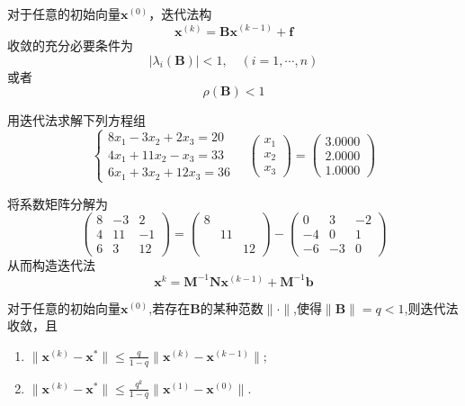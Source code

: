 \begin{theorem}[迭代法基本定理]
    对于任意的初始向量$\boldsymbol{x}^{(0)}$，迭代法构
    \[
        \boldsymbol{x}^{(k)} = \boldsymbol{Bx}^{(k-1)}+\boldsymbol{f}
    \]
    收敛的充分必要条件为
    \[
        |\lambda_{i}(\boldsymbol{B})|<1,\quad (i = 1,\cdots,n)
    \]
    或者
    \[
        \rho(\boldsymbol{B})<1
    \]
\end{theorem}
\begin{example}
    用迭代法求解下列方程组
    \[
        \begin{cases}
            8x_1-3x_2+2x_3=20\\
            4x_1+11x_2-x_3=33\\
            6x_1+3x_2+12x_3=36
        \end{cases}
        \quad
        \begin{pmatrix}x_1\\x_2\\x_3\end{pmatrix}
        =
        \begin{pmatrix}3.0000\\2.0000\\1.0000\end{pmatrix}
    \]
    \begin{solution}
        将系数矩阵分解为
        \[
            \begin{pmatrix}
                8 & -3 & 2\\
                4 & 11 & -1\\
                6 & 3 & 12
            \end{pmatrix} = 
            \begin{pmatrix}
                8 &  & \\
                 & 11 & \\
                 &  & 12
            \end{pmatrix}-
            \begin{pmatrix}
                0 & 3 & -2\\
                -4 & 0 & 1\\
                -6 & -3 & 0
            \end{pmatrix}
        \]
        从而构造迭代法
        \[
            \boldsymbol{x}^{k} = 
                \boldsymbol{M}^{-1}\boldsymbol{N}\boldsymbol{x}^{(k-1)}+\boldsymbol{M}^{-1}\boldsymbol{b}
        \]
    \end{solution}
\end{example}
\begin{theorem}
    对于任意的初始向量$\boldsymbol{x}^{(0)}$,若存在$\boldsymbol{B}$的某种范数$\parallel\cdot\parallel$,使得$\parallel \boldsymbol{B}\parallel=q<1$,则迭代法收敛，且
    \begin{enumerate}
        \item $\parallel \boldsymbol{x}^{(k)}-\boldsymbol{x}^{*}\parallel\leq\frac{q}{1-q}\parallel \boldsymbol{x}^{(k)}-\boldsymbol{x}^{(k-1)}\parallel;$
        \item $\parallel \boldsymbol{x}^{(k)}-\boldsymbol{x}^{*}\parallel\leq\frac{q^{k}}{1-q}\parallel \boldsymbol{x}^{(1)}-\boldsymbol{x}^{(0)}\parallel.$
    \end{enumerate}
\end{theorem}
